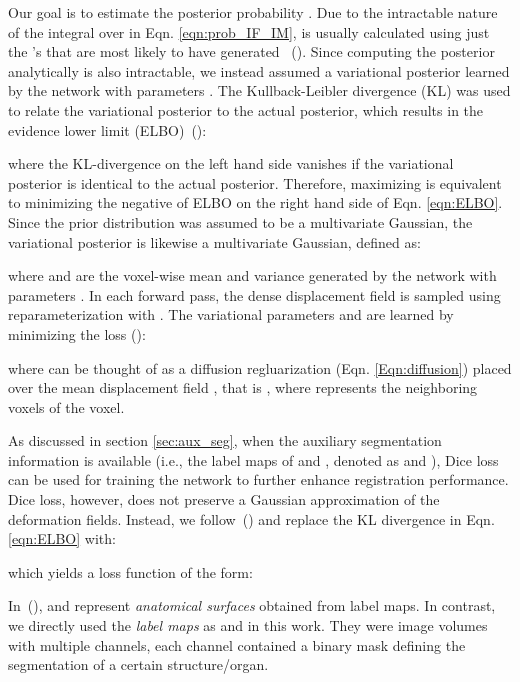 \documentclass[times,twocolumn,final]{elsarticle}
\begin{document}
Our goal is to estimate the posterior probability . Due to the intractable nature of the integral over  in Eqn. \ref{eqn:prob_IF_IM},  is usually calculated using just the 's that are most likely to have generated ~(\cite{krebs2019learning}). Since computing the posterior  analytically is also intractable, we instead assumed a variational posterior  learned by the network with parameters . The Kullback-Leibler divergence (KL) was used to relate the variational posterior to the actual posterior, which results in the evidence lower limit (ELBO)~(\cite{kingma2013auto}):
\begin{linenomath}

\end{linenomath}
where the KL-divergence on the left hand side vanishes if the variational posterior is identical to the actual posterior. Therefore, maximizing  is equivalent to minimizing the negative of ELBO on the right hand side of Eqn. \ref{eqn:ELBO}. Since the prior distribution  was assumed to be a multivariate Gaussian, the variational posterior is likewise a multivariate Gaussian, defined as:
\begin{linenomath}

\end{linenomath}
where  and  are the voxel-wise mean and variance generated by the network with parameters . In each forward pass, the dense displacement field  is sampled using reparameterization  with . The variational parameters  and  are learned by minimizing the loss
(\cite{dalca2019unsupervised}):
\begin{linenomath}

\end{linenomath}
where  can be thought of as a diffusion regluarization (Eqn. \ref{Eqn:diffusion}) placed over the mean displacement field , that is  , where  represents the neighboring voxels of the  voxel. 

As discussed in section \ref{sec:aux_seg}, when the auxiliary segmentation information is available (i.e., the label maps of  and , denoted as  and ), Dice loss can be used for training the network to further enhance registration performance. Dice loss, however, does not preserve a Gaussian approximation of the deformation fields. Instead, we follow~(\cite{dalca2019unsupervised}) and replace the KL divergence in Eqn. \ref{eqn:ELBO} with:
\begin{linenomath}

\end{linenomath}
which yields a loss function of the form:
\begin{linenomath}

\end{linenomath}
In~(\cite{dalca2019unsupervised}),  and  represent \textit{anatomical surfaces} obtained from label maps. In contrast, we directly used the \textit{label maps} as  and  in this work. They were image volumes with multiple channels, each channel contained a binary mask defining the segmentation of a certain structure/organ.
\end{document}
